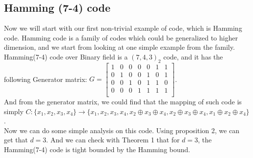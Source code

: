 \documentclass{article}
\begin{document}
\subsection{Hamming (7-4) code}
Now we will start with our first non-trivial example of code, which is Hamming code. Hamming code is a family of codes which could be generalized to higher dimension, and we start from looking at one simple example from the family.\\
Hamming(7-4) code over Binary field is a $(7,4,3)_2$ code, and it has the following Generator matrix:
$G = \begin{bmatrix}
	1 & 0 & 0 & 0 & 0 & 1 & 1 \\
	0 & 1 & 0 & 0 & 1 & 0 & 1 \\
	0 & 0 & 1 & 0 & 1 & 1 & 0  \\
	0 & 0 & 0 & 1 & 1 & 1 & 1 \\
    \end{bmatrix}$.\\
And from the generator matrix, we could find that the mapping of such code is simply 
$C: \{x_1, x_2, x_3,x_4\} \rightarrow \{x_1,x_2,x_3,x_4, x_2\oplus x_3\oplus x_4,x_2\oplus x_3\oplus x_4,x_1\oplus x_2\oplus x_4\}$.\\
Now we can do some simple analysis on this code. Using proposition 2, we can get that $d = 3$. And we can check with Theorem 1 that for $d=3$, the Hamming(7-4) code is tight bounded by the Hamming bound.
\end{document}
